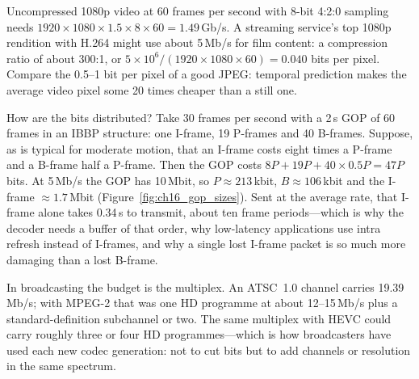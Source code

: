 
\begin{worked}
Uncompressed 1080p video at 60 frames per second with 8-bit 4:2:0 sampling needs
$1920\times1080\times1.5\times8\times60=1.49$\,Gb/s. A streaming service's top 1080p rendition with H.264
might use about 5\,Mb/s for film content: a compression ratio of about 300:1, or
$5\times10^6/(1920\times1080\times60)=0.040$ bits per pixel. Compare the 0.5--1 bit per pixel of a good JPEG:
temporal prediction makes the average video pixel some 20 times cheaper than a still one.

How are the bits distributed? Take 30 frames per second with a 2\,s GOP of 60 frames in an IBBP
structure: one I-frame, 19 P-frames and 40 B-frames. Suppose, as is typical for moderate motion, that an
I-frame costs eight times a P-frame and a B-frame half a P-frame. Then the GOP costs
$8P+19P+40\times0.5P=47P$ bits. At 5\,Mb/s the GOP has 10\,Mbit, so $P\approx213$\,kbit,
$B\approx106$\,kbit and the I-frame $\approx1.7$\,Mbit (Figure~\ref{fig:ch16_gop_sizes}). Sent at the
average rate, that I-frame alone takes 0.34\,s to transmit, about ten frame periods---which is why the
decoder needs a buffer of that order, why low-latency applications use intra refresh instead of
I-frames, and why a single lost I-frame packet is so much more damaging than a lost B-frame.

In broadcasting the budget is the multiplex. An ATSC~1.0 channel carries 19.39\,Mb/s; with MPEG-2 that
was one HD programme at about 12--15\,Mb/s plus a standard-definition subchannel or two. The same multiplex
with HEVC could carry roughly three or four HD programmes---which is how broadcasters have used each new
codec generation: not to cut bits but to add channels or resolution in the same spectrum.
\end{worked}


